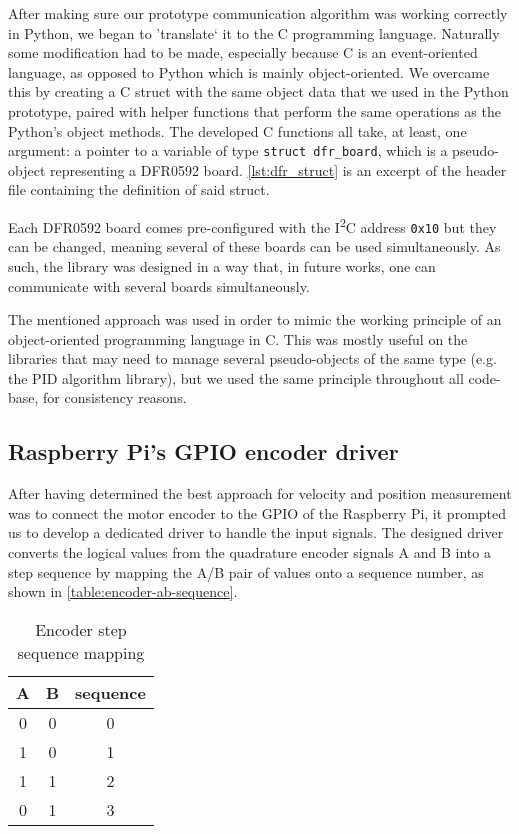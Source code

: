 After making sure our prototype communication algorithm was working correctly in Python, we began to 'translate` it to the C programming language.
Naturally some modification had to be made, especially because C is an event-oriented language, as opposed to Python which is mainly object-oriented.
We overcame this by creating a C struct with the same object data that we used in the Python prototype, paired with helper functions that perform the same operations as the Python's object methods.
The developed C functions all take, at least, one argument: a pointer to a variable of type \verb|struct dfr_board|, which is a pseudo-object representing a DFR0592 board.
\autoref{lst:dfr_struct} is an excerpt of the header file containing the definition of said struct.



Each DFR0592 board comes pre-configured with the I\textsuperscript{2}C address \verb|0x10| but they can be changed, meaning several of these boards can be used simultaneously.
As such, the library was designed in a way that, in future works, one can communicate with several boards simultaneously.

The mentioned approach was used in order to mimic the working principle of an object-oriented programming language in C.
This was mostly useful on the libraries that may need to manage several pseudo-objects of the same type (e.g. the PID algorithm library), but we used the same principle throughout all code-base, for consistency reasons.

\subsection{Raspberry Pi's GPIO encoder driver}
After having determined the best approach for velocity and position measurement was to connect the motor encoder to the GPIO of the Raspberry Pi, it prompted us to develop a dedicated driver to handle the input signals.
The designed driver converts the logical values from the quadrature encoder signals A and B into a step sequence by mapping the A/B pair of values onto a sequence number, as shown in \autoref{table:encoder-ab-sequence}.

\begin{table}[htp]
	\centering
	\caption{Encoder step sequence mapping}
	\label{table:encoder-ab-sequence}
	\begin{tabular}{|c|c|c|}
		\hline
		A & B & sequence  \\
		\hline
		0 & 0 & 0         \\
		\hline
		1 & 0 & 1         \\
		\hline
		1 & 1 & 2         \\
		\hline
		0 & 1 & 3         \\
		\hline
	\end{tabular}
\end{table}

